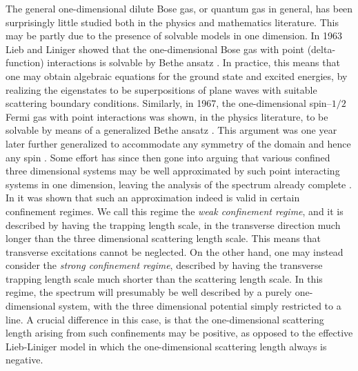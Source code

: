 The general one-dimensional dilute Bose gas, or quantum gas in general, has been surprisingly little studied both in the physics and mathematics literature. This may be partly due to the presence of solvable models in one dimension. In 1963 Lieb and Liniger showed that the one-dimensional Bose gas with point (delta-function) interactions is solvable by Bethe ansatz \cite{lieb1963exact}. In practice, this means that one may obtain algebraic equations for the ground state and excited energies, by realizing the eigenstates to be superpositions of plane waves with suitable scattering boundary conditions. Similarly, in 1967, the one-dimensional spin--$ 1/2 $ Fermi gas with point interactions was shown, in the physics literature, to be solvable by means of a generalized Bethe ansatz \cite{yang1967some}. This argument was one year later further generalized to accommodate any symmetry of the domain and hence any spin \cite{sutherland1968further}. Some effort has since then gone into arguing that various confined three dimensional systems may be well approximated by such point interacting systems in one dimension, leaving the analysis of the spectrum already complete \cite{olshanii1998atomic,petrov2000regimes,dunjko2001bosons,lieb2003one,lieb2004one,seiringer2008lieb}. In \cite{lieb2003one,lieb2004one,seiringer2008lieb} it was shown that such an approximation indeed is valid in certain confinement regimes. We call this regime the \emph{weak confinement regime}, and it is described by having the trapping length scale, in the transverse direction much longer than the three dimensional scattering length scale. This means that transverse excitations cannot be neglected. On the other hand, one may instead consider the \emph{strong confinement regime}, described by having the transverse trapping length scale much shorter than the scattering length scale. In this regime, the spectrum will presumably be well described by a purely one-dimensional system, with the three dimensional potential simply restricted to a line. A crucial difference in this case, is that the one-dimensional scattering length arising from such confinements may be positive, as opposed to the effective Lieb-Liniger model in which the one-dimensional scattering length always is negative.\\
